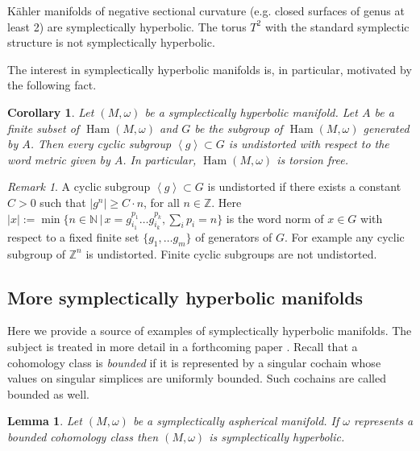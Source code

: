 \documentclass[12pt]{amsart}
\newtheorem{corollary}[subsection]{Corollary}
\newtheorem{lemma}[subsection]{Lemma}
\numberwithin{equation}{section}
\theoremstyle{definition}
\theoremstyle{remark}
\newtheorem{remark}[subsection]{Remark}
\numberwithin{figure}{section}
\numberwithin{table}{section}
\newcommand{\Mo}{(M,\omega )}
\newcommand\Ham{\operatorname{Ham}}
\begin{document}
K\"ahler manifolds of negative sectional curvature  
(e.g. closed surfaces of genus at least 2)  
are symplectically hyperbolic. The torus $T^2$ with the standard symplectic 
structure is not symplectically hyperbolic. 
 
The interest in symplectically hyperbolic manifolds is, in particular, motivated 
by the following fact. 
 
\begin{corollary}\label{C:polt} 
Let $\Mo$ be a symplectically hyperbolic manifold. Let $A$ be a finite subset of  
$\Ham\Mo$ and $G$ be the subgroup of $\Ham\Mo$ generated by $A$.  
Then every cyclic subgroup $\left<g\right>\subset G$ is undistorted with  
respect to the word metric given by $A$. 
In particular, $\Ham\Mo$ is torsion free. 
\end{corollary} 
 
\begin{remark} 
A cyclic subgroup $\left<g\right > \subset G$  
is undistorted if there 
exists a constant $C>0$ such that $|g^n|\geq C\cdot n$, 
for all $n\in \mathbb Z$. Here  
$|x|:=\min\{n\in \mathbb N\,|\, x=g_{i_1}^{p_1}\ldots g_{i_k}^{p_k}, \sum_i 
p_i=n\}$  
is the word norm of $x\in G$ with respect to a fixed finite set  
$\{g_1,\ldots g_m\}$ of generators of $G$. For example any 
cyclic subgroup of $\mathbb Z^n$ is undistorted. Finite cyclic subgroups 
are not undistorted. 
\end{remark} 
 
\subsection{More symplectically hyperbolic manifolds} 
\label{SS:more} 
 
Here we provide a source of examples of 
symplectically hyperbolic manifolds. The subject is 
treated in more detail in a forthcoming paper \cite{K}. 
Recall that a cohomology class is {\em bounded} if it is represented 
by a singular cochain whose values on singular 
simplices are uniformly bounded. Such cochains are 
called bounded as well. 
 
 
 
\begin{lemma}\label{L:bounded} 
Let $\Mo$ be a symplectically aspherical manifold. 
If $\omega$ represents a bounded cohomology class 
then $\Mo$ is symplectically hyperbolic. 
\end{lemma} 
 
\end{document}
